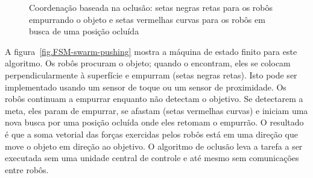 \begin{figure}
\begin{center}
\end{center}
\caption{Coordenação baseada na oclusão: setas negras retas para os robôs empurrando o objeto e setas vermelhas curvas para os robôs em busca de uma posição ocluída}\label{fig.swarm-pushing}
\end{figure}

A figura~\ref{fig.FSM-swarm-pushing} mostra a máquina de estado finito para este algoritmo. Os robôs procuram o objeto; quando o encontram, eles se colocam perpendicularmente à superfície e empurram (setas negras retas). Isto pode ser implementado usando um sensor de toque ou um sensor de proximidade. Os robôs continuam a empurrar enquanto não detectam o objetivo. Se detectarem a meta, eles param de empurrar, se afastam (setas vermelhas curvas) e iniciam uma nova busca por uma posição ocluída onde eles retomam o empurrão. O resultado é que a soma vetorial das forças exercidas pelos robôs está em uma direção que move o objeto em direção ao objetivo. O algoritmo de oclusão leva a tarefa a ser executada sem uma unidade central de controle e até mesmo sem comunicações entre robôs.

